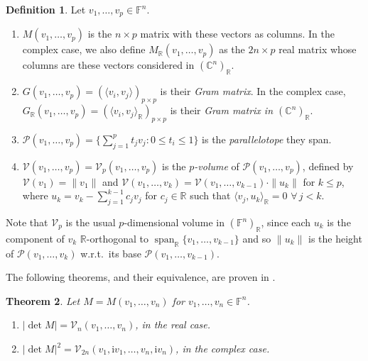 \documentclass{birkjour}
\newtheorem{theorem}{Theorem}[section]
\theoremstyle{definition}
\newtheorem{definition}[theorem]{Definition}
\def\R			{\mathds{R}}
\def\C			{\mathds{C}}
\def\F			{\mathds{F}}
\def\VV			{\mathcal{V}}
\def\PP			{\mathcal{P}}
\def\wrt					{w.r.t.\ }
\def\im	 					{\mathrm{i}}				%
\newcommand\inner[1] 		{\langle #1 \rangle}		%
\DeclareMathOperator{\Span}{span}
\begin{document}
\begin{definition}\label{df:main}
	Let $v_1,\ldots,v_p \in \F^n$.
	\begin{enumerate}[label = (\roman*)]
		\item $M(v_1,\ldots,v_p)$ is the $n \times p$ matrix with these vectors as columns.
		In the complex case, we also define $M_\R(v_1,\ldots,v_p)$ as the $2n \times p$ real matrix whose columns are these vectors considered in $(\C^n)_\R$.

		
		\item $G(v_1,\ldots,v_p) = \left(\inner{v_i,v_j}\right)_{p \times p}$ is their \emph{Gram matrix}.
		In the complex case,
		$G_\R(v_1,\ldots,v_p) = \left(\inner{v_i,v_j}_\R\right)_{p \times p}$ is their \emph{Gram matrix in $(\C^n)_\R$}.
		
		\item $\PP(v_1,\ldots,v_p) = \{\sum_{j=1}^p t_j v_j: 0\leq t_i \leq 1\}$ is the \emph{parallelotope} they span.
		
		\item $\VV(v_1,\ldots,v_p) = \VV_p(v_1,\ldots,v_p)$ is the \emph{$p$-volume} of $\PP(v_1,\ldots,v_p)$, defined by $\VV(v_1) = \|v_1\|$ and $\VV(v_1,\ldots,v_k) = \VV(v_1,\ldots,v_{k-1}) \cdot \|u_k\|$ for $k \leq p$, where $u_k = v_k - \sum_{j=1}^{k-1} c_j v_j$ for $c_j \in \R$ such that $\inner{v_j,u_k}_\R = 0$ $\forall\, j<k$. \label{it:volume}
	\end{enumerate}
\end{definition}

Note that $\VV_p$ is the usual $p$-dimensional volume in $(\F^n)_\R$, since each $u_k$ is the component of $v_k$  $\R$-orthogonal to $\Span_\R\{v_1,\ldots,v_{k-1}\}$ and so $\|u_k\|$ is the height of $\PP(v_1,\ldots,v_k)$ \wrt its base $\PP(v_1,\ldots,v_{k-1})$.


The following theorems, and their equivalence, are proven in .


\begin{theorem}\label{pr:det vol}
	Let $M=M(v_1,\ldots,v_n)$ for $v_1,\ldots,v_n \in \F^n$. 
	\begin{enumerate}[label = (\roman*)]
		\item $|\det M| = \VV_n(v_1,\ldots,v_n)$, in the real case. \label{it:real det}
		
		\item $|\det M|^2 = \VV_{2n}(v_1,\im v_1,\ldots,v_n,\im v_n)$, in the complex case. \label{it:complex det}
	\end{enumerate}
\end{theorem}
\end{document}
